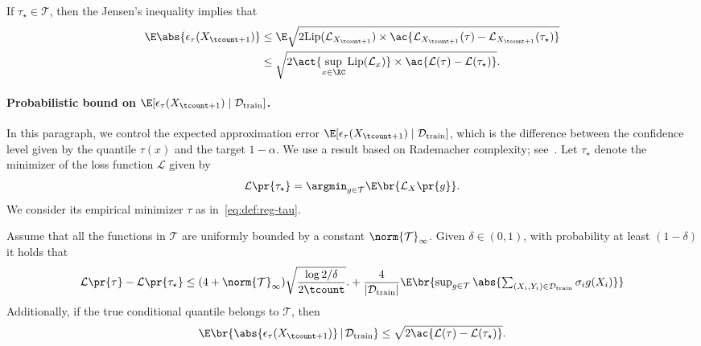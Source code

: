 
If $\tau_\star\in\mathcal{T}$, then the Jensen's inequality implies that
\begin{align*}
  \E\abs{\epsilon_{\tau}(X_{\tcount+1})}
  &\le \E\sqrt{ 2 \mathrm{Lip}(\mathcal{L}_{X_{\tcount+1}}) \times \ac{ \mathcal{L}_{X_{\tcount+1}}(\tau) - \mathcal{L}_{X_{\tcount+1}}(\tau_\star) } }
  \\
  &\le \sqrt{ 2 \act{\sup_{x\in\XC}\mathrm{Lip}(\mathcal{L}_{x})} \times \ac{ \mathcal{L}(\tau) - \mathcal{L}(\tau_\star) } }.
\end{align*}


\paragraph{Probabilistic bound on $\E[\epsilon_{\tau}(X_{\tcount+1}) \mid \mathcal{D}_{\mathrm{train}}]$.}
  In this paragraph, we control the expected approximation error $\E[\epsilon_{\tau}(X_{\tcount+1}) \mid \mathcal{D}_{\mathrm{train}}]$, which is the difference between the confidence level given by the quantile $\tau(x)$ and the target $1-\alpha$. We use a result based on Rademacher complexity; see~\cite[Theorem~6]{takeuchi2006nonparametric}. Let $\tau_{\star}$ denote the minimizer of the loss function $\mathcal{L}$ given by
  \begin{equation*}
    \mathcal{L}\pr{\tau_{\star}}
    = \argmin_{g\in \mathcal{T}}\E\br{\mathcal{L}_{X}\pr{g}}.
  \end{equation*}
  We consider its empirical minimizer $\tau$ as in~\eqref{eq:def:reg-tau}.
  \thmspace

  \begin{theorem}
    Assume that all the functions in $\mathcal{T}$ are uniformly bounded by a constant $\norm{\mathcal{T}}_{\infty}$. 
    Given $\delta\in(0,1)$, with probability at least $(1-\delta)$ it holds that
    \begin{equation*}
      \mathcal{L}\pr{\tau} - \mathcal{L}\pr{\tau_{\star}} 
      \le (4 + \norm{\mathcal{T}}_{\infty}) \sqrt{\frac{\log 2 / \delta}{2 \tcount}}.
      + \frac{4}{|\mathcal{D}_{\mathrm{train}}|} \E\br{\textstyle \sup _{g \in \mathcal{T}}\abs{ \sum_{(X_i,Y_i)\in\mathcal{D}_{\mathrm{train}}} \sigma_i g(X_i) }}
    \end{equation*}
    Additionally, if the true conditional quantile belongs to $\mathcal{T}$, then
    \begin{equation*}
      \E\br{ \abs{\epsilon_{\tau}(X_{\tcount+1})} \,\vert\, \mathcal{D}_{\mathrm{train}} }
      \le \sqrt{ 2 \ac{ \mathcal{L}(\tau) - \mathcal{L}(\tau_\star) } }.
    \end{equation*}
  \end{theorem}


